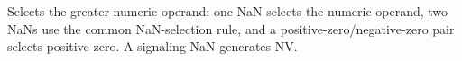 Selects the greater numeric operand; one NaN selects the numeric operand, two NaNs use the common NaN-selection rule, and a positive-zero/negative-zero pair selects positive zero. A signaling NaN generates NV.
